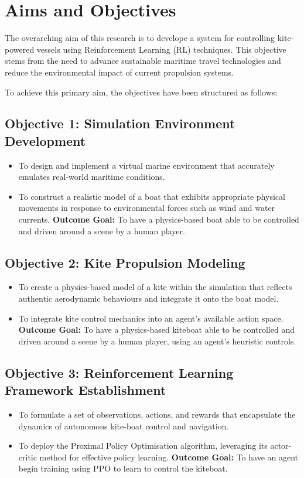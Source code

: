 \section{Aims and Objectives}

The overarching aim of this research is to develope a system for controlling kite-powered vessels using Reinforcement Learning (RL) techniques. This objective stems from the need to advance sustainable maritime travel technologies and reduce the environmental impact of current propulsion systems. 

To achieve this primary aim, the objectives have been structured as follows:

\subsection*{Objective 1: Simulation Environment Development}
\begin{itemize}
    \item To design and implement a virtual marine environment that accurately emulates real-world maritime conditions.
    \item To construct a realistic model of a boat that exhibits appropriate physical movements in response to environmental forces such as wind and water currents.
    \newline\textbf{Outcome Goal:} To have a physics-based boat able to be controlled and driven around a scene by a human player.
\end{itemize}

\subsection*{Objective 2: Kite Propulsion Modeling}
\begin{itemize}
    \item To create a physics-based model of a kite within the simulation that reflects authentic aerodynamic behaviours and integrate it onto the boat model.
    \item To integrate kite control mechanics into an agent’s available action space.
    \newline\textbf{Outcome Goal:} To have a physics-based kiteboat able to be controlled and driven around a scene by a human player, using an agent's heuristic controls.
\end{itemize}

\subsection*{Objective 3: Reinforcement Learning Framework Establishment}
\begin{itemize}
    \item To formulate a set of observations, actions, and rewards that encapsulate the dynamics of autonomous kite-boat control and navigation.
    \item To deploy the Proximal Policy Optimisation algorithm, leveraging its actor-critic method for effective policy learning.
    \newline\textbf{Outcome Goal:} To have an agent begin training using PPO to learn to control the kiteboat.
\end{itemize}

